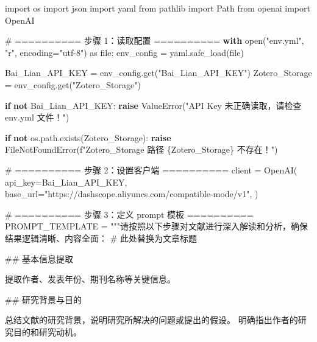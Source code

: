 \documentclass[
  letterpaper,
  DIV=11,
  numbers=noendperiod]{scrreprt}
\newenvironment{Shaded}{\begin{snugshade}}{\end{snugshade}}
\newcommand{\BuiltInTok}[1]{\textcolor[rgb]{0.00,0.23,0.31}{#1}}
\newcommand{\CommentTok}[1]{\textcolor[rgb]{0.37,0.37,0.37}{#1}}
\newcommand{\ControlFlowTok}[1]{\textcolor[rgb]{0.00,0.23,0.31}{\textbf{#1}}}
\newcommand{\ImportTok}[1]{\textcolor[rgb]{0.00,0.46,0.62}{#1}}
\newcommand{\KeywordTok}[1]{\textcolor[rgb]{0.00,0.23,0.31}{\textbf{#1}}}
\newcommand{\NormalTok}[1]{\textcolor[rgb]{0.00,0.23,0.31}{#1}}
\newcommand{\OperatorTok}[1]{\textcolor[rgb]{0.37,0.37,0.37}{#1}}
\newcommand{\PreprocessorTok}[1]{\textcolor[rgb]{0.68,0.00,0.00}{#1}}
\newcommand{\SpecialCharTok}[1]{\textcolor[rgb]{0.37,0.37,0.37}{#1}}
\newcommand{\SpecialStringTok}[1]{\textcolor[rgb]{0.13,0.47,0.30}{#1}}
\newcommand{\StringTok}[1]{\textcolor[rgb]{0.13,0.47,0.30}{#1}}
\begin{document}
\begin{Shaded}
\begin{Highlighting}[]
\ImportTok{import}\NormalTok{ os}
\ImportTok{import}\NormalTok{ json}
\ImportTok{import}\NormalTok{ yaml}
\ImportTok{from}\NormalTok{ pathlib }\ImportTok{import}\NormalTok{ Path}
\ImportTok{from}\NormalTok{ openai }\ImportTok{import}\NormalTok{ OpenAI}

\CommentTok{\# ========== 步骤 1：读取配置 ==========}
\ControlFlowTok{with} \BuiltInTok{open}\NormalTok{(}\StringTok{"env.yml"}\NormalTok{, }\StringTok{"r"}\NormalTok{, encoding}\OperatorTok{=}\StringTok{"utf{-}8"}\NormalTok{) }\ImportTok{as} \BuiltInTok{file}\NormalTok{:}
\NormalTok{    env\_config }\OperatorTok{=}\NormalTok{ yaml.safe\_load(}\BuiltInTok{file}\NormalTok{)}

\NormalTok{Bai\_Lian\_API\_KEY }\OperatorTok{=}\NormalTok{ env\_config.get(}\StringTok{"Bai\_Lian\_API\_KEY"}\NormalTok{)}
\NormalTok{Zotero\_Storage }\OperatorTok{=}\NormalTok{ env\_config.get(}\StringTok{"Zotero\_Storage"}\NormalTok{)}

\ControlFlowTok{if} \KeywordTok{not}\NormalTok{ Bai\_Lian\_API\_KEY:}
    \ControlFlowTok{raise} \PreprocessorTok{ValueError}\NormalTok{(}\StringTok{"API Key 未正确读取，请检查 env.yml 文件！"}\NormalTok{)}

\ControlFlowTok{if} \KeywordTok{not}\NormalTok{ os.path.exists(Zotero\_Storage):}
    \ControlFlowTok{raise} \PreprocessorTok{FileNotFoundError}\NormalTok{(}\SpecialStringTok{f"Zotero\_Storage 路径 }\SpecialCharTok{\{}\NormalTok{Zotero\_Storage}\SpecialCharTok{\}}\SpecialStringTok{ 不存在！"}\NormalTok{)}

\CommentTok{\# ========== 步骤 2：设置客户端 ==========}
\NormalTok{client }\OperatorTok{=}\NormalTok{ OpenAI(}
\NormalTok{    api\_key}\OperatorTok{=}\NormalTok{Bai\_Lian\_API\_KEY,}
\NormalTok{    base\_url}\OperatorTok{=}\StringTok{"https://dashscope.aliyuncs.com/compatible{-}mode/v1"}\NormalTok{,}
\NormalTok{)}

\CommentTok{\# ========== 步骤 3：定义 prompt 模板 ==========}
\NormalTok{PROMPT\_TEMPLATE }\OperatorTok{=} \StringTok{"""请按照以下步骤对文献进行深入解读和分析，确保结果逻辑清晰、内容全面：}
\StringTok{\# 此处替换为文章标题}

\StringTok{\#\# 基本信息提取}

\StringTok{提取作者、发表年份、期刊名称等关键信息。}

\StringTok{\#\# 研究背景与目的}

\StringTok{总结文献的研究背景，说明研究所解决的问题或提出的假设。}
\StringTok{明确指出作者的研究目的和研究动机。}


\end{Highlighting}
\end{Shaded}
\end{document}
